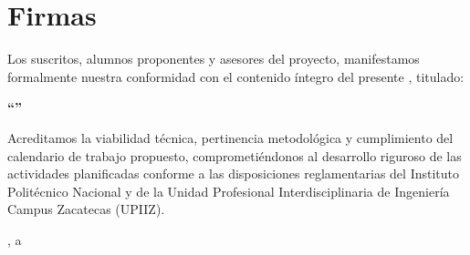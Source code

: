 
\chapter*{Firmas}
\label{cap:proto-firmas}

Los suscritos, alumnos proponentes y asesores del proyecto, manifestamos formalmente nuestra conformidad con el contenido íntegro del presente \textbf{\NombreTipoDocumento}, titulado:

\begin{center}
    {\fontsize{13}{16}\bfseries\sffamily ``\tituloProyecto''}\\[1.0em]
\end{center}

\noindent Acreditamos la viabilidad técnica, pertinencia metodológica y cumplimiento del calendario de trabajo propuesto, comprometiéndonos al desarrollo riguroso de las actividades planificadas conforme a las disposiciones reglamentarias del Instituto Politécnico Nacional y de la Unidad Profesional Interdisciplinaria de Ingeniería Campus Zacatecas (UPIIZ).

\vspace{1.5cm}

\bloqueFirmasProtocolo[1.0cm]

\vfill
\begin{center}
    {\fontsize{11}{14}\sffamily \lugarDefensa, a \fechaDefensa}
\end{center}

